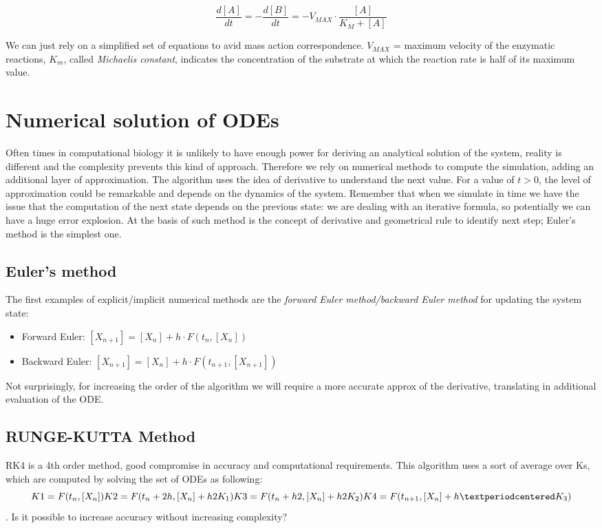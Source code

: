 $$\frac{d[A]}{dt}= - \frac{d[B]}{dt}= -V_{MAX}\cdot \frac{[A]}{K_M+[A]}$$

\noindent
We can just rely on a simplified set of equations to avid mass action correspondence.
$V_{MAX}$ = maximum velocity of the enzymatic reactions, $K_m$, called \emph{Michaelis constant}, indicates the concentration of the substrate at which the reaction rate is half of its maximum value.

\section{Numerical solution of ODEs}
Often times in computational biology it is unlikely to have enough power for deriving an analytical solution of the system, reality is different and the complexity prevents this kind of approach.
Therefore we rely on numerical methods to compute the simulation, adding an additional layer of approximation.
The algorithm uses the idea of derivative to understand the next value.
For a value of $t>0$, the level of approximation could be remarkable and depends on the dynamics of the system.
Remember that when we simulate in time we have the issue that the computation of the next state depends on the previous state: we are dealing with an iterative formula, so potentially we can have a huge error explosion.
At the basis of such method is the concept of derivative and geometrical rule to identify next step; Euler's method is the simplest one.

  \subsection{Euler's method}
  The first examples of explicit/implicit numerical methods are the \emph{forward Euler method/backward Euler method} for updating the system state:

  \begin{itemize}
    \item Forward Euler: $[X_{n+1}] = [X_n]+h·F(t_n,[X_n])$
    \item Backward Euler: $[X_{n+1}] = [X_n]+h·F(t_{n+1},[X_{n+1}])$
  \end{itemize}
\noindent
  Not surprisingly, for increasing the order of the algorithm we will require a more accurate approx of the derivative, translating in additional evaluation of the ODE.

  \subsection{RUNGE-KUTTA Method}
  RK4 is a 4th order method, good compromise in accuracy and computational requirements.
  This algorithm uses a sort of average over Ks, which are computed by solving the set of ODEs as following:
  $$K1 = F(t_n,[X_n])\\ K2 = F(t_n + 2h,[X_n]+ h2K_1)\\K3 = F(t_n + h2,[X_n]+ h2K_2)\\ K4 = F(t_{n+1},[X_n]+h·K_3)$$.
  Is it possible to increase accuracy without increasing complexity?

